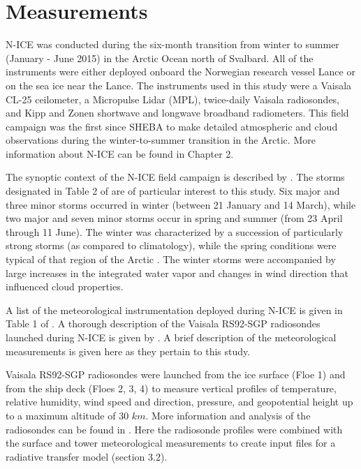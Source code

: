 \section{Measurements}
N-ICE was conducted during the six-month transition from winter to summer (January - June 2015) in the Arctic Ocean north of Svalbard. All of the instruments were either deployed onboard the Norwegian research vessel Lance or on the sea ice near the Lance. The instruments used in this study were a Vaisala CL-25 ceilometer, a Micropulse Lidar (MPL), twice-daily Vaisala radiosondes, and Kipp and Zonen shortwave and longwave broadband radiometers. This field campaign was the first since SHEBA to make detailed atmospheric and cloud observations during the winter-to-summer transition in the Arctic. More information about N-ICE can be found in Chapter 2. 

The synoptic context of the N-ICE field campaign is described by \citet{cohen:2017}. The storms designated in Table 2 of \citet{cohen:2017} are of particular interest to this study. Six major and three minor storms occurred in winter (between 21 January and 14 March), while two major and seven minor storms occur in spring and summer (from 23 April through 11 June). The winter was characterized by a succession of particularly strong storms (as compared to climatology), while the spring conditions were typical of that region of the Arctic \citep{graham:2017}. The winter storms were accompanied by large increases in the integrated water vapor and changes in wind direction \citep{kayser:2017} that influenced cloud properties.

A list of the meteorological instrumentation deployed during N-ICE is given in Table 1 of \citet{cohen:2017}. A thorough description of the Vaisala RS92-SGP radiosondes launched during N-ICE is given by \citet{kayser:2017}. A brief description of the meteorological measurements is given here as they pertain to this study.

Vaisala RS92-SGP radiosondes were launched from the ice surface (Floe 1) and from the ship deck (Floes 2, 3, 4) to measure vertical profiles of temperature, relative humidity, wind speed and direction, pressure, and geopotential height up to a maximum altitude of 30 $km$. More information and analysis of the radiosondes can be found in \citep{kayser:2017}. Here the radiosonde profiles were combined with the surface and tower meteorological measurements to create input files for a radiative transfer model (section 3.2).


